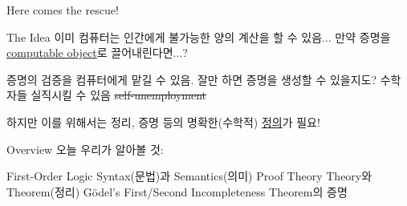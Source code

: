 \documentclass[../231120_msquare_computational-logic.tex]{subfiles}
\begin{document}
\begin{frame}{Here comes the rescue!}
    \begin{exampleblock}{The Idea}
        이미 컴퓨터는 인간에게 불가능한 양의 계산을 할 수 있음...
        만약 증명을 \ul{computable object}로 끌어내린다면...?
    \end{exampleblock}
    \pause
    \begin{enumerate}
        \ii 증명의 검증을 컴퓨터에게 맡길 수 있음. \pause
        \ii 잘만 하면 증명을 생성할 수 있을지도? \pause
        \ii 수학자들 실직시킬 수 있음 \sout{\color{gray}self-unemployment} \pause
    \end{enumerate}
    \begin{alertblock}{}
        하지만 이를 위해서는 \alert{정리, 증명} 등의 \alert{명확한(수학적) \ul{정의}}가 필요!
    \end{alertblock}
\end{frame}

\begin{frame}{Overview}
    오늘 우리가 알아볼 것: \pause
    \begin{block}{}
        \begin{enumerate}
            \ii First-Order Logic
            \ii Syntax(문법)과 Semantics(의미)
            \ii Proof Theory
            \ii Theory와 Theorem(정리) \pause
            \ii Gödel's First/Second Incompleteness Theorem의 증명
                \begin{itemize}
                \end{itemize} \pause
        \end{enumerate}
    \end{block}
\end{frame}
    
\end{document}
